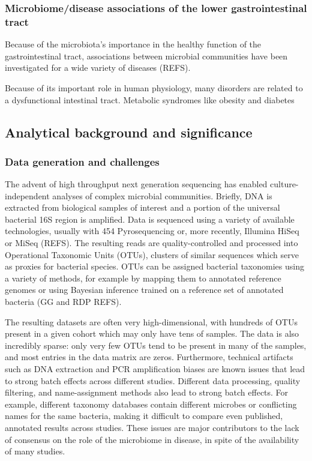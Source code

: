 \documentclass[12pt]{article}
\begin{document}
\subsubsection{Microbiome/disease associations of the lower gastrointestinal tract}
Because of the microbiota's importance in the healthy function of the gastrointestinal tract, associations between microbial communities have been investigated for a wide variety of diseases (REFS). 

Because of its important role in human physiology, many disorders are related to a dysfunctional intestinal tract. Metabolic syndromes like obesity and diabetes 

\subsection{Analytical background and significance}

\subsubsection{Data generation and challenges}
The advent of high throughput next generation sequencing has enabled culture-independent analyses of complex microbial communities. Briefly, DNA is extracted from biological samples of interest and a portion of the universal bacterial 16S region is amplified. Data is sequenced using a variety of available technologies, usually with 454 Pyrosequencing or, more recently, Illumina HiSeq or MiSeq (REFS). The resulting reads are quality-controlled and processed into Operational Taxonomic Units (OTUs), clusters of similar sequences which serve as proxies for bacterial species. OTUs can be assigned bacterial taxonomies using a variety of methods, for example by mapping them to annotated reference genomes or using Bayesian inference trained on a reference set of annotated bacteria (GG and RDP REFS). 

The resulting datasets are often very high-dimensional, with hundreds of OTUs present in a given cohort which may only have tens of samples. The data is also incredibly sparse: only very few OTUs tend to be present in many of the samples, and most entries in the data matrix are zeros. Furthermore, technical artifacts such as DNA extraction and PCR amplification biases are known issues that lead to strong batch effects across different studies. Different data processing, quality filtering, and name-assignment methods also lead to strong batch effects. For example, different taxonomy databases contain different microbes or conflicting names for the same bacteria, making it difficult to compare even published, annotated results across studies.  These issues are major contributors to the lack of consensus on the role of the microbiome in disease, in spite of the availability of many studies.
\end{document}

